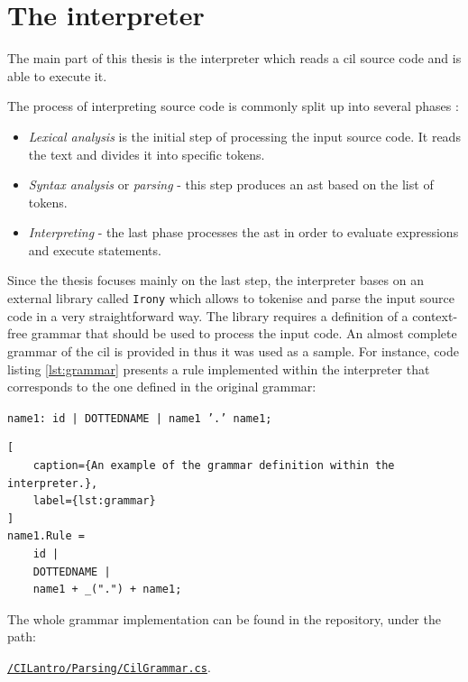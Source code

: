 \documentclass[declaration,shortabstract,english,mgr]{iithesis}
\begin{document}
\clearpage


\chapter{The interpreter}
\label{sec:interpreter}

The main part of this thesis is the interpreter which reads a \acrshort{cil} source code and is able to execute it.

The process of interpreting source code is commonly split up into several phases \cite{compilerDesign}:
\begin{itemize}
	\item{\textit{Lexical analysis} is the initial step of processing the input source code. It reads the text and divides it into specific tokens.}
	\item{\textit{Syntax analysis} or \textit{parsing} - this step produces an \acrshort{ast} based on the list of tokens.}
	\item{\textit{Interpreting} - the last phase processes the \acrshort{ast} in order to evaluate expressions and execute statements.}
\end{itemize}

Since the thesis focuses mainly on the last step, the interpreter bases on an external library called \texttt{Irony} which allows to tokenise and parse the input source code in a very straightforward way. The library requires a definition of a context-free grammar that should be used to process the input code. An almost complete grammar of the \acrshort{cil} is provided in \cite{ecmaStandard} thus it was used as a sample. For instance, code listing \ref{lst:grammar} presents a rule implemented within the interpreter that corresponds to the one defined in the original grammar:
\begin{center}
\texttt{name1: id
| DOTTEDNAME
| name1 '.' name1;}
\end{center}
\begin{lstlisting}[
	caption={An example of the grammar definition within the interpreter.},
	label={lst:grammar}
]
name1.Rule =
	id |
	DOTTEDNAME |
	name1 + _(".") + name1;
\end{lstlisting}
The whole grammar implementation can be found in the repository, under the path:
\begin{center}
	\href{https://github.com/kvasnyk/CILantro/blob/master/CILantro/CILantro/Parsing/CilGrammar.cs}{\texttt{/CILantro/Parsing/CilGrammar.cs}}.
\end{center}
\end{document}
